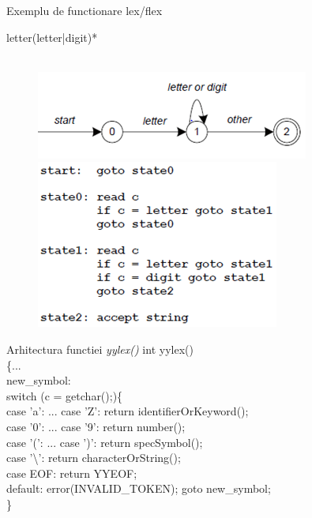 \documentclass[pdf]{beamer}
\begin{document}
\begin{frame}{Exemplu de functionare lex/flex}

letter(letter|digit)*   \\~\\

\begin{figure}
\centering
\includegraphics[scale=0.7]{compil4.PNG}\par
\includegraphics[scale=0.7]{compil5.PNG}\par
\end{figure}

\end{frame}



\begin{frame}{Arhitectura functiei \textit{yylex()}}
int yylex() \\
\{... \\
new\_symbol:\\
switch (c = getchar();)\{\\
case 'a': ... case 'Z': return identifierOrKeyword();\\
case '0': ... case '9': return number();\\
case '(': ... case ')': return specSymbol();\\
case '\textbackslash': return characterOrString();\\
case EOF: return YYEOF;\\
default: error(INVALID\_TOKEN); goto new\_symbol;\\
\}

\end{frame}
\end{document}
